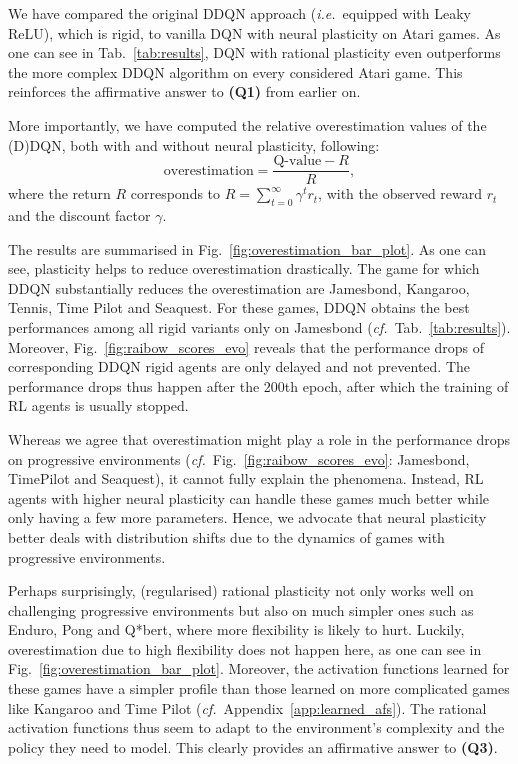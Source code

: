 \documentclass[accepted]{article}
\theoremstyle{plain}
\theoremstyle{definition}
\theoremstyle{remark}
\newcommand{\ie}{\emph{i.e.}~}
\newcommand{\cf}{\emph{cf.}~}
\begin{document}
We have compared the original DDQN approach (\ie equipped with Leaky ReLU), which is rigid, to vanilla DQN with neural plasticity on Atari games. As one can see in Tab.~\ref{tab:results},  
DQN with rational plasticity even outperforms the more complex DDQN algorithm on every considered Atari game. This reinforces the affirmative answer to \textbf{(Q1)} from earlier on. 

More importantly, we have computed the relative overestimation values of the (D)DQN, both with and without neural plasticity, following:
\begin{equation}
  \text{overestimation}= \frac{\text {Q-value}-R}{R},
  \label{eq:overestimation}
\end{equation}
where the return $R$ corresponds to $R = \sum_{t=0}^{\infty}{\gamma^t r_t}$, with the observed reward $r_t$ and the discount factor $\gamma$. 

The results are summarised in Fig.~\ref{fig:overestimation_bar_plot}. 
As one can see, plasticity helps to reduce overestimation drastically. The game for which DDQN substantially reduces the overestimation are Jamesbond, Kangaroo, Tennis, Time Pilot and Seaquest. For these games, DDQN obtains the best performances among all rigid variants only on Jamesbond (\cf Tab.~\ref{tab:results}). 
Moreover, Fig.~\ref{fig:raibow_scores_evo} reveals that the performance drops of corresponding DDQN rigid agents are only delayed and not prevented. The performance drops thus happen after the 200th epoch, after which the training of RL agents is usually stopped. 

Whereas we agree that overestimation might play a role in the performance drops on progressive environments (\cf Fig.~\ref{fig:raibow_scores_evo}: Jamesbond, TimePilot and Seaquest), it cannot fully explain the phenomena.
Instead, RL agents with higher neural plasticity can handle these games much better while only having a few more parameters. Hence, we advocate that neural plasticity better deals with distribution shifts due to the dynamics of games with progressive environments. 

Perhaps surprisingly, (regularised) rational plasticity not only works well on challenging progressive environments but also on much simpler ones such as Enduro, Pong and Q*bert, where more flexibility is likely to hurt. 
Luckily, overestimation due to high flexibility does not happen here, as one can see in Fig.~\ref{fig:overestimation_bar_plot}. 
Moreover, the activation functions learned for these games have a simpler profile than those learned on more complicated games like Kangaroo and Time Pilot (\cf Appendix~\ref{app:learned_afs}). The rational activation functions thus seem to adapt to the environment's complexity and the policy they need to model. This clearly provides an affirmative answer to \textbf{(Q3)}.
\end{document}
